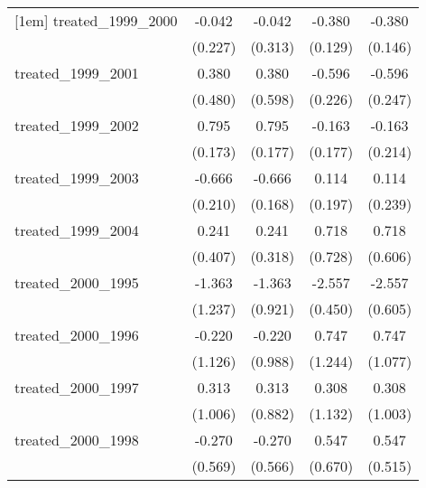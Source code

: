 {\begin{tabular}{l*{4}{c}}
[1em]
treated\_1999\_2000&      -0.042         &      -0.042         &      -0.380\sym{**} &      -0.380\sym{**} \\
            &     (0.227)         &     (0.313)         &     (0.129)         &     (0.146)         \\
[1em]
treated\_1999\_2001&       0.380         &       0.380         &      -0.596\sym{**} &      -0.596\sym{*}  \\
            &     (0.480)         &     (0.598)         &     (0.226)         &     (0.247)         \\
[1em]
treated\_1999\_2002&       0.795\sym{***}&       0.795\sym{***}&      -0.163         &      -0.163         \\
            &     (0.173)         &     (0.177)         &     (0.177)         &     (0.214)         \\
[1em]
treated\_1999\_2003&      -0.666\sym{**} &      -0.666\sym{***}&       0.114         &       0.114         \\
            &     (0.210)         &     (0.168)         &     (0.197)         &     (0.239)         \\
[1em]
treated\_1999\_2004&       0.241         &       0.241         &       0.718         &       0.718         \\
            &     (0.407)         &     (0.318)         &     (0.728)         &     (0.606)         \\
[1em]
treated\_2000\_1995&      -1.363         &      -1.363         &      -2.557\sym{***}&      -2.557\sym{***}\\
            &     (1.237)         &     (0.921)         &     (0.450)         &     (0.605)         \\
[1em]
treated\_2000\_1996&      -0.220         &      -0.220         &       0.747         &       0.747         \\
            &     (1.126)         &     (0.988)         &     (1.244)         &     (1.077)         \\
[1em]
treated\_2000\_1997&       0.313         &       0.313         &       0.308         &       0.308         \\
            &     (1.006)         &     (0.882)         &     (1.132)         &     (1.003)         \\
[1em]
treated\_2000\_1998&      -0.270         &      -0.270         &       0.547         &       0.547         \\
            &     (0.569)         &     (0.566)         &     (0.670)         &     (0.515)         \\

\end{tabular}}
